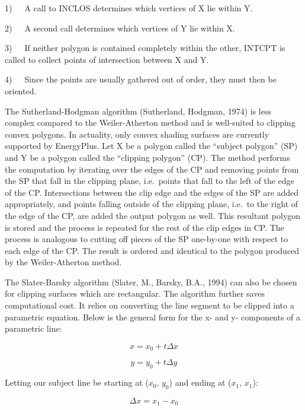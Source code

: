 1)~~~A call to INCLOS determines which vertices of X lie within Y.

2)~~~A second call determines which vertices of Y lie within X.

3)~~~If neither polygon is contained completely within the other, INTCPT is called to collect points of intersection between X and Y.

4)~~~Since the points are usually gathered out of order, they must then be oriented.

The Sutherland-Hodgman algorithm (Sutherland, Hodgman, 1974) is less complex compared to the Weiler-Atherton method and is well-suited to clipping convex polygons. In actuality, only convex shading surfaces are currently supported by EnergyPlus. Let X be a polygon called the ``subject polygon'' (SP) and Y be a polygon called the ``clipping polygon'' (CP). The method performs the computation by iterating over the edges of the CP and removing points from the SP that fall in the clipping plane, i.e.~points that fall to the left of the edge of the CP. Intersections between the clip edge and the edges of the SP are added appropriately, and points falling outside of the clipping plane, i.e.~to the right of the edge of the CP, are added the output polygon as well. This resultant polygon is stored and the process is repeated for the rest of the clip edges in CP. The process is analogous to cutting off pieces of the SP one-by-one with respect to each edge of the CP. The result is ordered and identical to the polygon produced by the Weiler-Atherton method.

The Slater-Barsky algorithm (Slater, M., Barsky, B.A., 1994) can also be chosen for clipping surfaces which are rectangular. The algorithm further saves computational cost. It relies on converting the line segment to be clipped into a parametric equation. Below is the general form for the x- and y- components of a parametric line:

\begin{equation}
x = x_0 + t \Delta x
\end{equation}

\begin{equation}
y = y_0 + t \Delta y
\end{equation}

Letting our subject line be starting at ($x_0$, $y_0$) and ending at ($x_1$, $x_1$):

\begin{equation}
\Delta x = x_1 - x_0
\end{equation}

